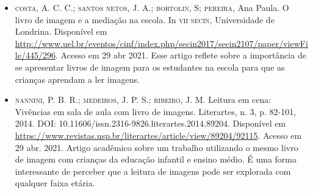 \documentclass[11pt]{extarticle}
\begin{document}
\begin{itemize}
\item \textsc{costa}, A. C. C.; \textsc{santos netos}, J. A.; \textsc{bortolin}, S; \textsc{pereira}, Ana Paula. O livro de imagem e a mediação na escola. 
In \textsc{vii secin}, Universidade de Londrina. Disponível em \url{http://www.uel.br/eventos/cinf/index.php/secin2017/secin2107/paper/viewFile/445/296}. 
Acesso em 29 abr 2021. 
Esse artigo reflete sobre a importância de se apresentar livros de imagem para os estudantes na escola para que as crianças aprendam a ler imagens. 

\item \textsc{nannini}, P. B. R.; \textsc{medeiros}, J. P. S.; \textsc{ribeiro}, J. M. Leitura em cena: Vivências em sala de aula com livro de imagens. 
Literartes, n. 3, p. 82-101, 2014. DOI: 10.11606/issn.2316-9826.literartes.2014.89204. 
Disponível em \url{https://www.revistas.usp.br/literartes/article/view/89204/92115}. Acesso em 29 abr. 2021. 
Artigo acadêmico sobre um trabalho utilizando o mesmo livro de imagem com crianças da educação infantil e ensino médio. 
É uma forma interessante de perceber que a leitura de imagens pode ser explorada com qualquer faixa etária. 
\end{itemize}
\end{document}
